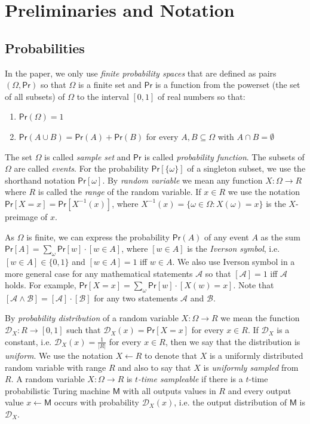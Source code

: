 \documentclass{article}
\newcommand{\prob}[0]{\mathsf{Pr}} %
\begin{document}
\section{Preliminaries and Notation}

\subsection{Probabilities}

In the paper, we only use \emph{finite probability spaces} that are defined as pairs $(\Omega, \prob)$ so that $\Omega$ is a finite set and $\prob$ is a function from the powerset (the set of all subsets) of $\Omega$ to the interval $[0,1]$ of real numbers so that:
\begin{enumerate}
\item $\prob(\Omega)=1$
\item $\prob(A\cup B)=\prob(A) + \prob(B)$ for every $A,B\subseteq \Omega$ with $A\cap B=\emptyset$
\end{enumerate}

\noindent The set $\Omega$ is called \emph{sample set} and $\prob$ is called \emph{probability function}. The subsets of $\Omega$ are called \emph{events}. For the probability $\prob[\{\omega\}]$ of a singleton subset, we use the shorthand notation $\prob[\omega]$.
By \emph{random variable} we mean any function $X\colon \Omega \rightarrow R$ where $R$ is called the \emph{range} of the random variable. If $x\in R$ we use the notation $\prob[X=x] = \prob[X^{-1}(x)]$, where $X^{-1}(x)=\{\omega\in\Omega\colon X(\omega)=x\}$ is the $X$-preimage of $x$.

As $\Omega$ is finite, we can express the probability $\prob(A)$ of any event $A$ as the sum $\prob[A]=\sum_\omega \prob[w]\cdot [w\in A]$, where
$[w\in A]$ is the \emph{Iverson symbol}, i.e. $[w\in A]\in\{0,1\}$ and $[w\in A]=1$ iff $w\in A$. We also use Iverson symbol in a more general case for any mathematical statements $\mathcal{A}$ so that $[\mathcal{A}]=1$ iff $\mathcal{A}$ holds. For example, $\prob[X=x]=\sum_\omega \prob[w]\cdot [X(w)=x]$. Note that $[\mathcal{A}\wedge \mathcal{B}]=[\mathcal{A}]\cdot[\mathcal{B}]$ for any two statements
$\mathcal{A}$ and $\mathcal{B}$.

By \emph{probability distribution} of a random variable $X\colon \Omega \rightarrow R$ we mean the function $\mathcal{D}_X\colon R\rightarrow [0,1]$ such that $\mathcal{D}_X(x)=\prob[X=x]$ for every $x\in R$.
If $\mathcal{D}_X$ is a constant, i.e.
$\mathcal{D}_X(x)=\frac{1}{|R|}$ for every $x\in R$, then we say that the distribution is \emph{uniform}.
We use the notation $X\gets R$ to denote that $X$ is a uniformly distributed random variable with range $R$ and also to say that $X$ is \emph{uniformly sampled} from $R$.
A random variable $X\colon \Omega \rightarrow R$ is \emph{$t$-time sampleable} if there is a $t$-time probabilistic Turing machine $\mathsf{M}$
with all outputs values in $R$ and every output value $x\gets \mathsf{M}$ occurs with probability $\mathcal{D}_X(x)$, i.e. the output distribution of
$\mathsf{M}$ is $\mathcal{D}_X$.
\end{document}
